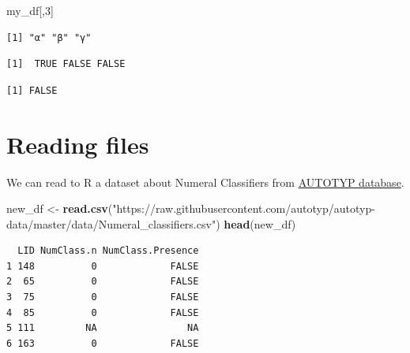 \documentclass[]{book}
\newenvironment{Shaded}{\begin{snugshade}}{\end{snugshade}}
\newcommand{\KeywordTok}[1]{\textcolor[rgb]{0.13,0.29,0.53}{\textbf{#1}}}
\newcommand{\DecValTok}[1]{\textcolor[rgb]{0.00,0.00,0.81}{#1}}
\newcommand{\StringTok}[1]{\textcolor[rgb]{0.31,0.60,0.02}{#1}}
\newcommand{\OperatorTok}[1]{\textcolor[rgb]{0.81,0.36,0.00}{\textbf{#1}}}
\newcommand{\NormalTok}[1]{#1}
\theoremstyle{definition}
\theoremstyle{definition}
\theoremstyle{definition}
\theoremstyle{remark}
\begin{document}
\begin{Shaded}
\begin{Highlighting}[]
\NormalTok{my_df[,}\DecValTok{3}\NormalTok{]}
\end{Highlighting}
\end{Shaded}

\begin{verbatim}
[1] "α" "β" "γ"
\end{verbatim}

\begin{Shaded}
\end{Shaded}

\begin{verbatim}
[1]  TRUE FALSE FALSE
\end{verbatim}

\begin{Shaded}
\end{Shaded}

\begin{verbatim}
[1] FALSE
\end{verbatim}

\section{Reading files}\label{reading-files}

We can read to R a dataset about Numeral Classifiers from
\href{https://github.com/autotyp/autotyp-data}{AUTOTYP database}.

\begin{Shaded}
\begin{Highlighting}[]
\NormalTok{new_df <-}\StringTok{ }\KeywordTok{read.csv}\NormalTok{(}\StringTok{"https://raw.githubusercontent.com/autotyp/autotyp-data/master/data/Numeral_classifiers.csv"}\NormalTok{)}
\KeywordTok{head}\NormalTok{(new_df)}
\end{Highlighting}
\end{Shaded}

\begin{verbatim}
  LID NumClass.n NumClass.Presence
1 148          0             FALSE
2  65          0             FALSE
3  75          0             FALSE
4  85          0             FALSE
5 111         NA                NA
6 163          0             FALSE
\end{verbatim}
\end{document}
